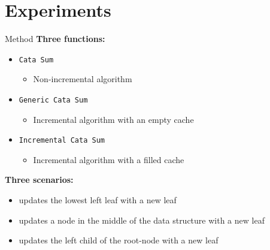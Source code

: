 \section{Experiments}

\begin{slide}{Method}
\textbf{Three functions:}
\begin{itemize}
  \item \texttt{Cata Sum} 
  \begin{itemize}
    \item Non-incremental algorithm
  \end{itemize}
  \item \texttt{Generic Cata Sum}
  \begin{itemize}
    \item Incremental algorithm with an empty cache
  \end{itemize}
  \item \texttt{Incremental Cata Sum}
  \begin{itemize}
    \item Incremental algorithm with a filled cache
  \end{itemize}
\end{itemize}

\textbf{Three scenarios:}
\begin{itemize}
\item{}   updates the lowest left leaf with a new leaf
\item{} updates a node in the middle of the data structure with a new leaf
\item{}    updates the left child of the root-node with a new leaf
\end{itemize} 

\end{slide}

